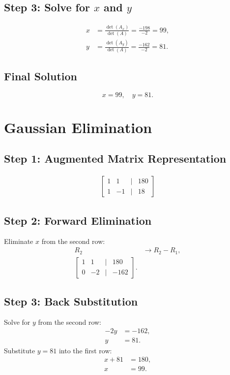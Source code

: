\documentclass[journal]{IEEEtran}
\begin{document}
\subsection*{Step 3: Solve for \(x\) and \(y\)}
\begin{align}
    x &= \frac{\det(A_x)}{\det(A)} = \frac{-198}{-2} = 99, \\
    y &= \frac{\det(A_y)}{\det(A)} = \frac{-162}{-2} = 81.
\end{align}

\subsection*{Final Solution}
\[\boxed{x = 99, \quad y = 81.}\]

\section{Gaussian Elimination}
\subsection*{Step 1: Augmented Matrix Representation}
\begin{align}
    \begin{bmatrix} 1 & 1 & | & 180 \\
                  1 & -1 & | & 18 \end{bmatrix}
\end{align}

\subsection*{Step 2: Forward Elimination}
Eliminate \(x\) from the second row:
\begin{align}
    R_2 &\to R_2 - R_1, \\
    \begin{bmatrix} 1 & 1 & | & 180 \\
                  0 & -2 & | & -162 \end{bmatrix}.
\end{align}

\subsection*{Step 3: Back Substitution}
Solve for \(y\) from the second row:
\begin{align}
    -2y &= -162, \\
    y &= 81.
\end{align}
Substitute \(y = 81\) into the first row:
\begin{align}
    x + 81 &= 180, \\
    x &= 99.
\end{align}
\end{document}
